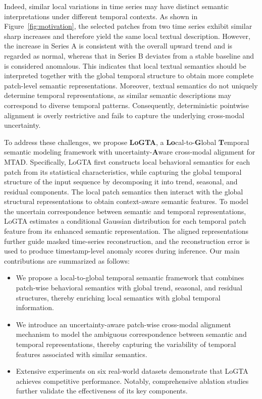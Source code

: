 \documentclass[letterpaper]{article} %
\begin{document}
Indeed, similar local variations in time series may have distinct semantic interpretations under different temporal contexts. As shown in Figure~\ref{fig:motivation}, the selected patches from two time series exhibit similar sharp increases and therefore yield the same local textual description. However, the increase in Series A is consistent with the overall upward trend and is regarded as normal, whereas that in Series B deviates from a stable baseline and is considered anomalous. This indicates that local textual semantics should be interpreted together with the global temporal structure to obtain more complete patch-level semantic representations. Moreover, textual semantics do not uniquely determine temporal representations, as similar semantic descriptions may correspond to diverse temporal patterns. Consequently, deterministic pointwise alignment is overly restrictive and fails to capture the underlying cross-modal uncertainty.


To address these challenges, we propose \textbf{LoGTA}, a \textbf{Lo}cal-to-\textbf{G}lobal \textbf{T}emporal semantic modeling framework with uncertainty-\textbf{A}ware cross-modal alignment for MTAD. Specifically, LoGTA first constructs local behavioral semantics for each patch from its statistical characteristics, while capturing the global temporal structure of the input sequence by decomposing it into trend, seasonal, and residual components. The local patch semantics then interact with the global structural representations to obtain context-aware semantic features. To model the uncertain correspondence between semantic and temporal representations, LoGTA estimates a conditional Gaussian distribution for each temporal patch feature from its enhanced semantic representation. The aligned representations further guide masked time-series reconstruction, and the reconstruction error is used to produce timestamp-level anomaly scores during inference. Our main contributions are summarized as follows:
\begin{itemize}
    \item We propose a local-to-global temporal semantic framework that combines patch-wise behavioral semantics with global trend, seasonal, and residual structures, thereby enriching local semantics with global temporal information.
    
    \item We introduce an uncertainty-aware patch-wise cross-modal alignment mechanism to model the ambiguous correspondence between semantic and temporal representations, thereby capturing the variability of temporal features associated with similar semantics.
    
    \item Extensive experiments on six real-world datasets demonstrate that LoGTA achieves competitive performance. Notably, comprehensive ablation studies further validate the effectiveness of its key components. 
\end{itemize}
\end{document}

